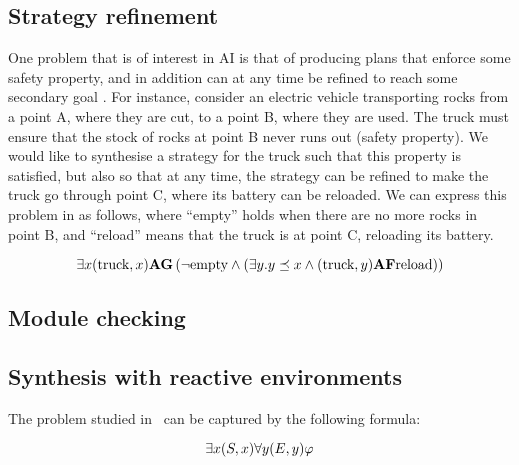 \subsection{Strategy refinement}
\label{sec-plan-B}

One problem that is of interest in AI is
that of producing plans that enforce some safety property, and in addition
can at any time be refined to reach some secondary goal \cite{WrightMN18,PercassiG19}. For instance,
consider an electric vehicle transporting rocks from a point A, where
they are cut, to a point B, where they are used. The truck must ensure
that the stock of rocks at point B never runs out (safety property). We would like to synthesise a
strategy for the truck such that  this property is satisfied, but also
so that at any time, the strategy can be refined to make the truck go
through point C, where its battery can be reloaded.
We can express  this problem in \SLref as follows, where ``empty''
holds when there are no more rocks in point B, and ``reload'' means
that the truck is at point C, reloading its battery.

\[\exists x (\text{truck},x) {\bf A} {\bf G} \left ( \neg \text{empty} \wedge
  (\exists y. y\preceq x \wedge (\text{truck},y){\bf A}{\bf F} \text{reload}) \right )\]


\subsection{Module checking}
\label{section:module}



\subsection{Synthesis with reactive environments}
\label{sec-synth-open-env}

The problem studied in~\cite{kupferman2000open} can be captured by the
following formula:

\[\exists x (S,x) \forall y (E,y) \varphi\]


